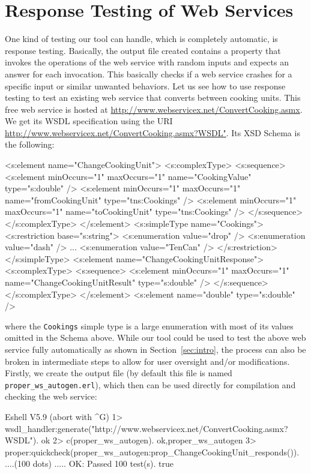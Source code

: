 \documentclass[submission,copyright]{eptcs}
\begin{document}
\section{Response Testing of Web Services} \label{sec:response_testing}

One kind of testing our tool can handle, which is completely
automatic, is response testing. Basically, the output file created
contains a property that invokes the operations of the web service
with random inputs and expects an answer for each invocation. This
basically checks if a web service crashes for a specific input or
similar unwanted behaviors.
%
Let us see how to use response testing to test an existing web service
that converts between cooking units. This free web service is hosted
at \url{http://www.webservicex.net/ConvertCooking.asmx}. We get its
WSDL specification using the URI
\url{http://www.webservicex.net/ConvertCooking.asmx?WSDL"}.
Its XSD Schema is the following:
\begin{lstxsd}
  <s:element name="ChangeCookingUnit">
    <s:complexType>
      <s:sequence>
        <s:element minOccurs="1" maxOccurs="1" name="CookingValue" type="s:double" />
        <s:element minOccurs="1" maxOccurs="1" name="fromCookingUnit" type="tns:Cookings" />
        <s:element minOccurs="1" maxOccurs="1" name="toCookingUnit" type="tns:Cookings" />
      </s:sequence>
    </s:complexType>
  </s:element>
  <s:simpleType name="Cookings">
    <s:restriction base="s:string">
      <s:enumeration value="drop" />
      <s:enumeration value="dash" />
      ...
      <s:enumeration value="TenCan" />
    </s:restriction>
  </s:simpleType>
  <s:element name="ChangeCookingUnitResponse">
    <s:complexType>
      <s:sequence>
        <s:element minOccurs="1" maxOccurs="1" name="ChangeCookingUnitResult" type="s:double" />
      </s:sequence>
    </s:complexType>
  </s:element>
  <s:element name="double" type="s:double" />
\end{lstxsd}
where the \texttt{Cookings} simple type is a large enumeration with
most of its values omitted in the Schema above. While our tool could
be used to test the above web service fully automatically as shown in
Section~\ref{sec:intro}, the process can also be broken in
intermediate steps to allow for user oversight and/or modifications.
Firstly, we create the output file (by default this file is named
\texttt{proper\_ws\_autogen.erl}), which then can be used directly for
compilation and checking the web service:

\begin{lstoutput}
Eshell V5.9  (abort with ^G)
1> wsdl_handler:generate("http://www.webservicex.net/ConvertCooking.asmx?WSDL").
ok
2> c(proper_ws_autogen).
{ok,proper_ws_autogen}
3> proper:quickcheck(proper_ws_autogen:prop_ChangeCookingUnit_responds()).
....(100 dots) .....
OK: Passed 100 test(s).
true
\end{lstoutput}
\end{document}
